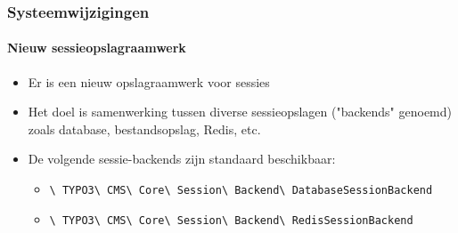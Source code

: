 
\begin{frame}[fragile]
	\frametitle{Systeemwijzigingen}
	\framesubtitle{Nieuw sessieopslagraamwerk}

	\begin{itemize}
		\item Er is een nieuw opslagraamwerk voor sessies
		\item Het doel is samenwerking tussen diverse sessieopslagen ("backends" genoemd)
			zoals database, bestandsopslag, Redis, etc.
		\item De volgende sessie-backends zijn standaard beschikbaar:

			\begin{itemize}
				\item
					\smaller\texttt{\textbackslash
						TYPO3\textbackslash
						CMS\textbackslash
						Core\textbackslash
						Session\textbackslash
						Backend\textbackslash
						DatabaseSessionBackend}

				\item
					\texttt{\textbackslash
						TYPO3\textbackslash
						CMS\textbackslash
						Core\textbackslash
						Session\textbackslash
						Backend\textbackslash
						RedisSessionBackend}
			\end{itemize}
	\end{itemize}

\end{frame}


